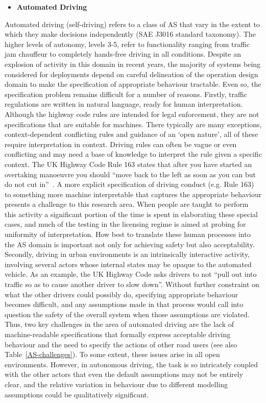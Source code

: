\documentclass[sigconf,nonacm]{acmart}%
\begin{document}
	\begin{itemize}[leftmargin=0.5cm]
		\item \textbf{Automated Driving} 
	\end{itemize}
	Automated driving (self-driving) refers to a class of AS that vary in the extent to which they make decisions independently (SAE J3016 standard taxonomy). The higher levels of autonomy, levels 3-5, refer to functionality ranging from traffic jam chauffeur to completely hands-free driving in all conditions. Despite an explosion of activity in this domain in recent years, the majority of systems being considered for deployments depend on careful delineation of the operation design domain to make the specification of appropriate behaviour tractable. Even so, the specification problem remains difficult for a number of reasons. 
	Firstly, traffic regulations are written in natural language, ready for human interpretation. Although the highway code rules are intended for legal enforcement, they are not specifications that are suitable for machines. 
	There typically are many exceptions, context-dependent conflicting rules and guidance of an `open nature', all of these require interpretation in context. 
	Driving rules can often be vague or even conflicting and may need a base of knowledge to interpret the rule given a specific context. The UK Highway Code Rule 163 states that after you have started an overtaking manoeuvre you should ``move back to the left as soon as you can but do not cut in''~\cite{UKHighwayCode22}. A more explicit specification of driving conduct (e.g. Rule 163) to something more machine interpretable that captures the appropriate behaviour presents a challenge to this research area. When people are taught to perform this activity a significant portion of the time is spent in elaborating these special cases, and much of the testing in the licensing regime is aimed at probing for uniformity of interpretation. How best to translate these human processes into the AS domain is important not only for achieving safety but also acceptability.
	Secondly, driving in urban environments is an intrinsically interactive activity, involving several actors whose internal states may be opaque to the automated vehicle. As an example, the UK Highway Code asks drivers to not ``pull out into traffic so as to cause another driver to slow down''. 
	Without further constraint on what the other drivers could possibly do, specifying appropriate behaviour becomes difficult, and any assumptions made in that process would call into question the safety of the overall system when those assumptions are violated. 
	Thus, two key challenges in the area of automated driving are the lack of machine-readable specifications that formally express acceptable driving behaviour and the need to specify the actions of other road users (see also Table~\ref{AS-challenges}). To some extent, these issues arise in all open environments. However, in autonomous driving, the task is so intricately coupled with the other actors that even the default assumptions may not be entirely clear, and the relative variation in behaviour due to different modelling assumptions could be qualitatively significant.
	
\end{document}
